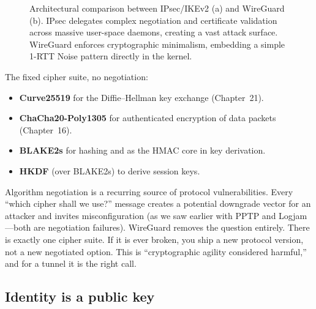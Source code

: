 \begin{figure}[H]
\caption{Architectural comparison between IPsec/IKEv2 (a) and WireGuard (b). IPsec delegates complex
negotiation and certificate validation across massive user-space daemons, creating a vast attack surface.
WireGuard enforces cryptographic minimalism, embedding a simple 1-RTT Noise pattern directly in the kernel.}
\label{ch30:fig-vpn-arch-comparison}
\end{figure}

The fixed cipher suite, no negotiation:
\begin{itemize}
\item \textbf{Curve25519} for the Diffie--Hellman key exchange (Chapter~21).
\item \textbf{ChaCha20-Poly1305} for authenticated encryption of data packets (Chapter~16).
\item \textbf{BLAKE2s} for hashing and as the HMAC core in key derivation.
\item \textbf{HKDF} (over BLAKE2s) to derive session keys.
\end{itemize}

\begin{intuitionbox}
Algorithm negotiation is a recurring source of protocol vulnerabilities. Every ``which cipher shall we use?'' message creates a potential downgrade vector for an attacker and invites misconfiguration (as we saw earlier with PPTP and Logjam---both are negotiation failures). WireGuard removes the question entirely. There is exactly one cipher suite. If it is ever broken, you ship a new protocol version, not a new negotiated option. This is ``cryptographic agility considered harmful,'' and for a tunnel it is the right call.
\end{intuitionbox}

\subsection{Identity is a public key}

